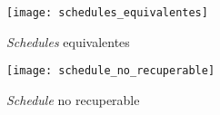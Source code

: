 \documentclass[a4paper, twoside]{article}
\begin{document}
\begin{figure}[H]
\noindent \begin{centering}
\texttt{[image: schedules\_equivalentes]}
\par\end{centering}

\protect\caption{\emph{Schedules} equivalentes}


\end{figure}
\begin{figure}[H]
\noindent \begin{centering}
\texttt{[image: schedule\_no\_recuperable]}
\par\end{centering}

\protect\caption{\emph{Schedule} no recuperable}
\end{figure}
\end{document}
